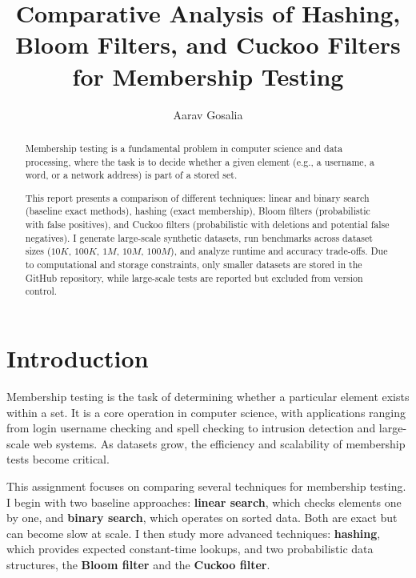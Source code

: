 \documentclass[acmsmall]{acmart}
\begin{document}
\title{Comparative Analysis of Hashing, Bloom Filters, and Cuckoo Filters for Membership Testing}

\author{Aarav Gosalia}

\begin{abstract}
Membership testing is a fundamental problem in computer science and data processing, where the task is to decide whether a given element (e.g., a username, a word, or a network address) is part of a stored set.

This report presents a comparison of different techniques: linear and binary search (baseline exact methods), hashing (exact membership), Bloom filters (probabilistic with false positives), and Cuckoo filters (probabilistic with deletions and potential false negatives). I generate large-scale synthetic datasets, run benchmarks across dataset sizes ($10K$, $100K$, $1M$, $10M$, $100M$), and analyze runtime and accuracy trade-offs. Due to computational and storage constraints, only smaller datasets are stored in the GitHub repository, while large-scale tests are reported but excluded from version control. 
\end{abstract}


\maketitle

\section{Introduction}
Membership testing is the task of determining whether a particular element exists within a set. It is a core operation in computer science, with applications ranging from login username checking and spell checking to intrusion detection and large-scale web systems. As datasets grow, the efficiency and scalability of membership tests become critical.  

This assignment focuses on comparing several techniques for membership testing. I begin with two baseline approaches: \textbf{linear search}, which checks elements one by one, 
and \textbf{binary search}, which operates on sorted data. Both are exact but can become slow at scale. I then study more advanced techniques: \textbf{hashing}, which provides expected constant-time lookups, and two probabilistic data structures, the \textbf{Bloom filter} and the \textbf{Cuckoo filter}.  
\end{document}
